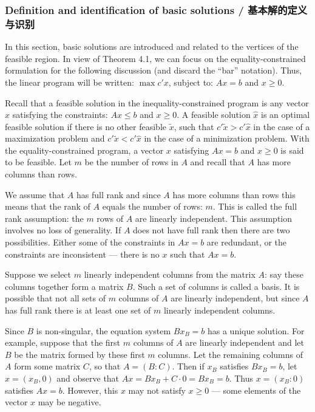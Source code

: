 \subsubsection{Definition and identification of basic solutions / 基本解的定义与识别}

\begin{original}
In this section, basic solutions are introduced and related to the vertices of the feasible region. In view of Theorem 4.1, we can focus on the equality-constrained formulation for the following discussion (and discard the ``bar'' notation). Thus, the linear program will be written: $\max c' x$, subject to: $Ax = b$ and $x \ge 0$.

Recall that a feasible solution in the inequality-constrained program is any vector $x$ satisfying the constraints: $Ax \le b$ and $x \ge 0$. A feasible solution $\hat{x}$ is an optimal feasible solution if there is no other feasible $\tilde{x}$, such that $c'\tilde{x} > c'\hat{x}$ in the case of a maximization problem and $c'\tilde{x} < c'\hat{x}$ in the case of a minimization problem. With the equality-constrained program, a vector $x$ satisfying $Ax = b$ and $x \ge 0$ is said to be feasible. Let $m$ be the number of rows in $A$ and recall that $A$ has more columns than rows.

We assume that $A$ has full rank and since $A$ has more columns than rows this means that the rank of $A$ equals the number of rows: $m$. This is called the full rank assumption: the $m$ rows of $A$ are linearly independent. This assumption involves no loss of generality. If $A$ does not have full rank then there are two possibilities. Either some of the constraints in $Ax = b$ are redundant, or the constraints are inconsistent --- there is no $x$ such that $Ax = b$.

Suppose we select $m$ linearly independent columns from the matrix $A$: say these columns together form a matrix $B$. Such a set of columns is called a basis. It is possible that not all sets of $m$ columns of $A$ are linearly independent, but since $A$ has full rank there is at least one set of $m$ linearly independent columns.

Since $B$ is non-singular, the equation system $Bx_B = b$ has a unique solution. For example, suppose that the first $m$ columns of $A$ are linearly independent and let $B$ be the matrix formed by these first $m$ columns. Let the remaining columns of $A$ form some matrix $C$, so that $A = (B : C)$. Then if $x_B$ satisfies $Bx_B = b$, let $x = (x_B, 0)$ and observe that $Ax = Bx_B + C \cdot 0 = Bx_B = b$. Thus $x = (x_B : 0)$ satisfies $Ax = b$. However, this $x$ may not satisfy $x \ge 0$ --- some elements of the vector $x$ may be negative.


\end{original}
